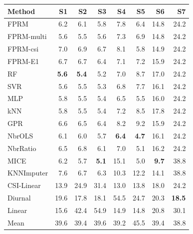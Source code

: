 \begin{tabular}{lrrrrrrr}
\toprule
Method & S1 & S2 & S3 & S4 & S5 & S6 & S7 \\
\midrule
FPRM & 6.2 & 6.1 & 5.8 & 7.8 & 6.4 & 14.8 & 24.2 \\
FPRM-multi & 5.6 & 5.5 & 5.6 & 7.3 & 6.9 & 14.8 & 24.2 \\
FPRM-csi & 7.0 & 6.9 & 6.7 & 8.1 & 5.8 & 14.9 & 24.2 \\
FPRM-E1 & 6.7 & 6.7 & 6.4 & 7.1 & 7.2 & 15.9 & 24.2 \\
\midrule
RF & \textbf{5.6} & \textbf{5.4} & 5.2 & 7.0 & 8.7 & 17.0 & 24.2 \\
SVR & 5.6 & 5.5 & 5.3 & 6.8 & 7.7 & 16.1 & 24.2 \\
MLP & 5.8 & 5.5 & 5.4 & 6.5 & 5.5 & 16.0 & 24.2 \\
kNN & 5.8 & 5.5 & 5.4 & 7.2 & 8.5 & 17.8 & 24.2 \\
GPR & 6.6 & 6.5 & 6.4 & 8.2 & 9.2 & 15.9 & 24.2 \\
\midrule
NbrOLS & 6.1 & 6.0 & 5.7 & \textbf{6.4} & \textbf{4.7} & 16.1 & 24.2 \\
NbrRatio & 6.5 & 6.8 & 6.1 & 7.0 & 5.1 & 16.2 & 24.2 \\
MICE & 6.2 & 5.7 & \textbf{5.1} & 15.1 & 5.0 & \textbf{9.7} & 38.8 \\
KNNImputer & 7.6 & 6.7 & 6.3 & 10.3 & 12.2 & 14.1 & 38.8 \\
\midrule
CSI-Linear & 13.9 & 24.9 & 31.4 & 13.0 & 13.8 & 18.0 & 24.2 \\
Diurnal & 19.6 & 17.8 & 18.1 & 54.5 & 24.7 & 20.3 & \textbf{18.5} \\
Linear & 15.6 & 42.4 & 54.9 & 14.9 & 14.8 & 20.8 & 30.1 \\
Mean & 39.6 & 39.4 & 39.6 & 39.2 & 45.5 & 39.4 & 38.8 \\
\bottomrule
\end{tabular}
